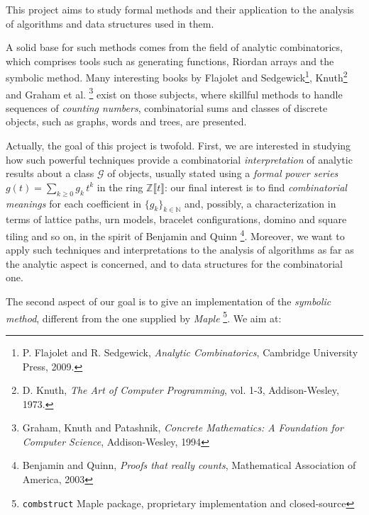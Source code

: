 
\noindent This project aims to study formal methods and their application to
the analysis of algorithms and data structures used in them.

A solid base for such
methods comes from the field of analytic combinatorics, which comprises tools
such as generating functions, Riordan arrays and the symbolic method. Many
interesting books by Flajolet and Sedgewick\footnote{P. Flajolet and R.
Sedgewick, \emph{Analytic Combinatorics}, Cambridge University Press, 2009.},
Knuth\footnote{D. Knuth, \emph{The Art of Computer Programming}, vol.  1-3,
Addison-Wesley, 1973.} and Graham et al. \footnote{Graham, Knuth and Patashnik,
\emph{Concrete Mathematics: A Foundation for Computer Science}, Addison-Wesley,
1994} exist on those subjects, where skillful methods to handle sequences of
\emph{counting numbers}, combinatorial sums and classes of discrete objects,
such as graphs, words and trees, are presented. 

Actually, the goal of this project is twofold. First,  we are interested in studying how such powerful techniques
provide a combinatorial \emph{interpretation} of analytic results about a class
$\mathcal{G}$ of objects, usually stated using a \emph{formal power series}
$g(t)=\sum_{k\geq0}{g_{k}\,t^{k}}$ in the ring $\mathbb{Z}\llbracket t
\rrbracket$: our final interest is to find \emph{combinatorial meanings} for
each coefficient in $\lbrace g_{k}\rbrace_{k\in\mathbb{N}}$ and, possibly, a
characterization in terms of lattice paths, urn models, bracelet
configurations, domino and square tiling and so on, in the spirit of Benjamin and Quinn
\footnote{Benjamin and Quinn, \emph{Proofs that really counts}, Mathematical
Association of America, 2003}.  Moreover, we want to apply such techniques and
interpretations to the analysis of algorithms as far as the analytic
aspect is concerned, and to data structures for the combinatorial one. %

The second aspect of our goal is to give an implementation of the
\emph{symbolic method}, different from the one supplied by \emph{Maple}
\footnote{\texttt{combstruct} Maple package, proprietary implementation and
closed-source}. We aim at: 
    
